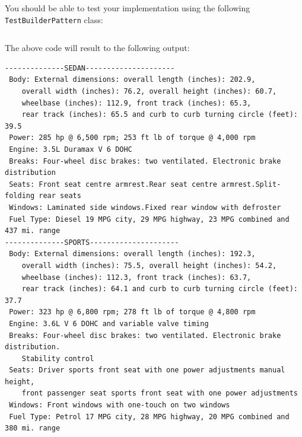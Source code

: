 \documentclass[12pt,a4paper]{exam}
\newcommand{\code}{/Users/keith/Documents/Courses/sdp/repo/worksheets/dp-two/kotlin/src}
\begin{document}
\begin{questions}
\inputminted{scala}{\code/builder/Car.kt}

You should be able to test your implementation using the following 
\verb!TestBuilderPattern! class:

\inputminted{scala}{\code/builder/TestBuilderPattern.kt}

The above code will result to the following output:
\begin{Verbatim}
--------------SEDAN--------------------- 
 Body: External dimensions: overall length (inches): 202.9, 
 	overall width (inches): 76.2, overall height (inches): 60.7, 
 	wheelbase (inches): 112.9, front track (inches): 65.3, 
 	rear track (inches): 65.5 and curb to curb turning circle (feet): 39.5
 Power: 285 hp @ 6,500 rpm; 253 ft lb of torque @ 4,000 rpm
 Engine: 3.5L Duramax V 6 DOHC
 Breaks: Four-wheel disc brakes: two ventilated. Electronic brake distribution
 Seats: Front seat centre armrest.Rear seat centre armrest.Split-folding rear seats
 Windows: Laminated side windows.Fixed rear window with defroster
 Fuel Type: Diesel 19 MPG city, 29 MPG highway, 23 MPG combined and 437 mi. range
--------------SPORTS--------------------- 
 Body: External dimensions: overall length (inches): 192.3, 
 	overall width (inches): 75.5, overall height (inches): 54.2, 
 	wheelbase (inches): 112.3, front track (inches): 63.7, 
 	rear track (inches): 64.1 and curb to curb turning circle (feet): 37.7
 Power: 323 hp @ 6,800 rpm; 278 ft lb of torque @ 4,800 rpm
 Engine: 3.6L V 6 DOHC and variable valve timing
 Breaks: Four-wheel disc brakes: two ventilated. Electronic brake distribution. 
 	Stability control
 Seats: Driver sports front seat with one power adjustments manual height, 
 	front passenger seat sports front seat with one power adjustments
 Windows: Front windows with one-touch on two windows
 Fuel Type: Petrol 17 MPG city, 28 MPG highway, 20 MPG combined and 380 mi. range	
\end{Verbatim}

%
%
%
%


\end{questions}
\end{document}
